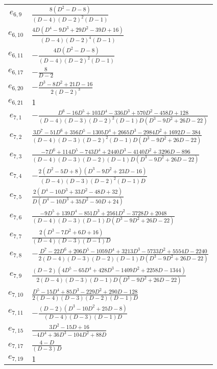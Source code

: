 \documentclass[a4paper,11pt]{article}
\begin{document}
\begin{longtable}{|c|l|}
    $e_{6, 9}$ & $\frac{8 \left(D^2-D-8\right)}{(D-4) (D-2)^2 (D-1)}$ \\
    $e_{6, 10}$ & $\frac{4 D \left(D^4-9 D^3+29 D^2-39 D+16\right)}{(D-4) (D-2)^4 (D-1)}$ \\
    $e_{6, 11}$ & $-\frac{4 D \left(D^2-D-8\right)}{(D-4) (D-2)^2 (D-1)}$ \\
    $e_{6, 17}$ & $-\frac{8}{D-2}$ \\
    $e_{6, 20}$ & $-\frac{D^3-8 D^2+21 D-16}{2 (D-2)^3}$ \\
    $e_{6, 21}$ & $1$ \\
    \hline
    $e_{7, 1}$ & $-\frac{D^6-16 D^5+103 D^4-336 D^3+570 D^2-458 D+128}{(D-4) (D-3) (D-2)^2 (D-1) D \left(D^3-9 D^2+26 D-22\right)}$ \\
    $e_{7, 2}$ & $\frac{3 D^7-51 D^6+356 D^5-1305 D^4+2665 D^3-2984 D^2+1692 D-384}{(D-4) (D-3) (D-2)^2 (D-1) D \left(D^3-9 D^2+26 D-22\right)}$ \\
    $e_{7, 3}$ & $\frac{-7 D^6+114 D^5-743 D^4+2440 D^3-4140 D^2+3296 D-896}{(D-4) (D-3) (D-2) (D-1) D \left(D^3-9 D^2+26 D-22\right)}$ \\
    $e_{7, 4}$ & $-\frac{2 \left(D^2-5 D+8\right) \left(D^3-9 D^2+23 D-16\right)}{(D-4) (D-3) (D-2)^2 (D-1) D}$ \\
    $e_{7, 5}$ & $\frac{2 \left(D^4-10 D^3+33 D^2-48 D+32\right)}{D \left(D^4-10 D^3+35 D^2-50 D+24\right)}$ \\
    $e_{7, 6}$ & $\frac{-9 D^5+139 D^4-851 D^3+2561 D^2-3728 D+2048}{(D-4) (D-3) (D-1) D \left(D^3-9 D^2+26 D-22\right)}$ \\
    $e_{7, 7}$ & $\frac{2 \left(D^3-7 D^2+6 D+16\right)}{(D-4) (D-3) (D-1) D}$ \\
    $e_{7, 8}$ & $-\frac{D^7-22 D^6+206 D^5-1059 D^4+3213 D^3-5733 D^2+5554 D-2240}{2 (D-4) (D-3) (D-2) (D-1) D \left(D^3-9 D^2+26 D-22\right)}$ \\
    $e_{7, 9}$ & $\frac{(D-2) \left(4 D^5-65 D^4+428 D^3-1409 D^2+2258 D-1344\right)}{2 (D-4) (D-3) (D-1) D \left(D^3-9 D^2+26 D-22\right)}$ \\
    $e_{7, 10}$ & $\frac{D^5-15 D^4+85 D^3-229 D^2+290 D-128}{2 (D-4) (D-3) (D-2) (D-1) D}$ \\
    $e_{7, 11}$ & $-\frac{(D-2) \left(D^3-10 D^2+25 D-8\right)}{(D-4) (D-3) (D-1) D}$ \\
    $e_{7, 15}$ & $\frac{3 D^2-15 D+16}{-4 D^4+36 D^3-104 D^2+88 D}$ \\
    $e_{7, 17}$ & $\frac{4-D}{(D-3) D}$ \\
    $e_{7, 19}$ & $1$ \\

\end{longtable}
\end{document}
